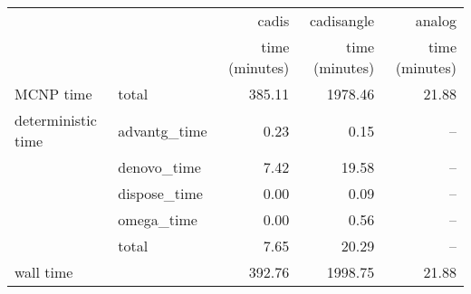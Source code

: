 \begin{tabular}{llrrr}
\toprule
          &              &          cadis &     cadisangle &         analog \\
          &              & time (minutes) & time (minutes) & time (minutes) \\
\midrule
MCNP time & total &         385.11 &        1978.46 &          21.88 \\
deterministic time & advantg\_time &           0.23 &           0.15 &            -- \\
          & denovo\_time &           7.42 &          19.58 &            -- \\
          & dispose\_time &           0.00 &           0.09 &            -- \\
          & omega\_time &           0.00 &           0.56 &            -- \\
          & total &           7.65 &          20.29 &            -- \\
wall time &              &         392.76 &        1998.75 &          21.88 \\
\bottomrule
\end{tabular}
